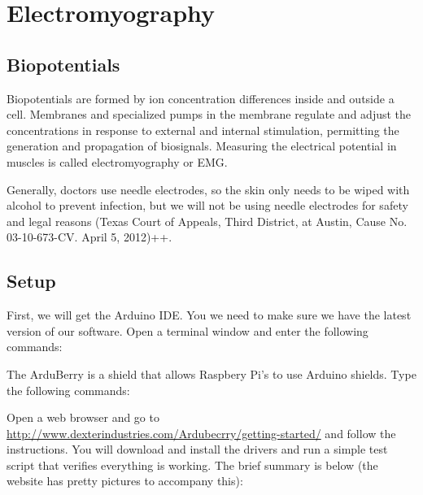 \chapter{Electromyography}

\section{Biopotentials}

Biopotentials are formed by ion concentration differences inside and outside a cell.  Membranes and specialized pumps in the membrane regulate and adjust the concentrations in response to external and internal stimulation, permitting the generation and propagation of biosignals.  Measuring the electrical potential in muscles is called electromyography or EMG.


Generally, doctors use needle electrodes, so the skin only needs to be wiped with alcohol to prevent infection, but we will not be using needle electrodes for safety and legal reasons (Texas Court of Appeals, Third District, at Austin, Cause No. 03-10-673-CV. April 5, 2012)++.

\section{Setup}

First, we will get the Arduino IDE.  You  we need to make sure we have the latest version of our software.   Open a terminal window and enter the following commands:




The ArduBerry is a shield that allows Raspbery Pi's to use Arduino shields.  Type the following commands:



Open a web browser and go to \url{http://www.dexterindustries.com/Ardubecrry/getting-started/} and follow the instructions.  You will download and install the drivers and run a simple test script that verifies everything is working.  The brief summary is below (the website has pretty pictures to accompany this):

